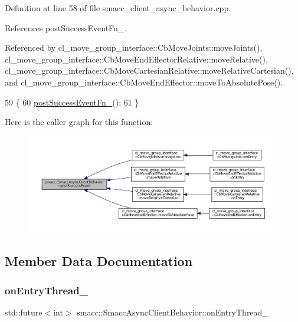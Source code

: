 Definition at line 58 of file smacc\+\_\+client\+\_\+async\+\_\+behavior.\+cpp.



References post\+Success\+Event\+Fn\+\_\+.



Referenced by cl\+\_\+move\+\_\+group\+\_\+interface\+::\+Cb\+Move\+Joints\+::move\+Joints(), cl\+\_\+move\+\_\+group\+\_\+interface\+::\+Cb\+Move\+End\+Effector\+Relative\+::move\+Relative(), cl\+\_\+move\+\_\+group\+\_\+interface\+::\+Cb\+Move\+Cartesian\+Relative\+::move\+Relative\+Cartesian(), and cl\+\_\+move\+\_\+group\+\_\+interface\+::\+Cb\+Move\+End\+Effector\+::move\+To\+Absolute\+Pose().


\begin{DoxyCode}
59     \{
60         \hyperlink{classsmacc_1_1SmaccAsyncClientBehavior_a944ed10880796d53649bee39dc1299c0}{postSuccessEventFn\_}();
61     \}
\end{DoxyCode}
Here is the caller graph for this function\+:
\nopagebreak
\begin{figure}[H]
\begin{center}
\leavevmode
\includegraphics[width=350pt]{classsmacc_1_1SmaccAsyncClientBehavior_adf18efe1f0e4eacc1277b8865a8a94b1_icgraph}
\end{center}
\end{figure}


\subsection{Member Data Documentation}
\mbox{\label{classsmacc_1_1SmaccAsyncClientBehavior_a6346e036a68f41c4397d7336f8519645}} 
\subsubsection{\texorpdfstring{on\+Entry\+Thread\+\_\+}{onEntryThread\_}}
{\footnotesize\ttfamily std\+::future$<$int$>$ smacc\+::\+Smacc\+Async\+Client\+Behavior\+::on\+Entry\+Thread\+\_\+\hspace{0.3cm}{\ttfamily [private]}}



